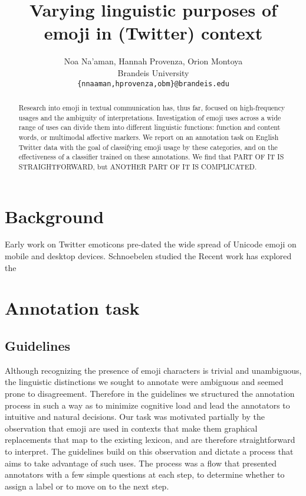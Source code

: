 \documentclass[11pt]{article}
\title{Varying linguistic purposes of emoji in (Twitter) context}
\author{Noa Na'aman, Hannah Provenza, Orion Montoya\\
  Brandeis University \\
  {\tt \{nnaaman,hprovenza,obm\}@brandeis.edu}\\}
\date{}
\begin{document}
\maketitle

\begin{abstract}

Research into emoji in textual communication has, thus far, focused on high-frequency usages and
the ambiguity of interpretations. Investigation of emoji uses across a wide range of uses can divide them
into different linguistic functions: function and content words, or multimodal affective markers. We report on an
annotation task on English Twitter data with the goal of classifying emoji usage by these categories, and on the
effectiveness of a classifier trained on these annotations. We find that 
PART OF IT IS STRAIGHTFORWARD, 
but
ANOTHER PART OF IT IS COMPLICATED.

\end{abstract}

\section{Background}

Early work on Twitter emoticons \cite{tylerEmoticons2012} pre-dated the wide spread of Unicode emoji on mobile and desktop devices. Schnoebelen studied the 
Recent work \cite{MillerEmoji2016} has explored the 



\section{Annotation task}

\subsection{Guidelines}

Although recognizing the presence of emoji characters is trivial and unambiguous, the linguistic distinctions
we sought to annotate were ambiguous and seemed prone to disagreement. Therefore in the guidelines we
structured the annotation process in such a way as to minimize cognitive load and lead the annotators to
intuitive and natural decisions. Our task was motivated partially by the observation that emoji are used
in contexts that make them graphical replacements that map to the existing lexicon, and are therefore
straightforward to interpret. The guidelines build on this observation and dictate a process that aims
to take advantage of such uses. The process was a flow that presented annotators with a few simple questions
at each step, to determine whether to assign a label or to move on to the next step.
\end{document}
